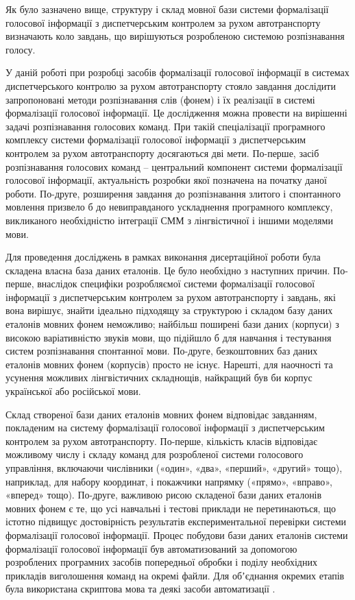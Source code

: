 Як було зазначено вище, структуру і склад мовної бази системи формалізації голосової інформації з диспетчерським контролем за рухом автотранспорту визначають коло завдань, що вирішуються розробленою системою розпізнавання голосу.

У даній роботі при розробці засобів формалізації голосової інформації в системах диспетчерського контролю за рухом автотранспорту стояло завдання дослідити запропоновані методи розпізнавання слів (фонем) і їх реалізації в системі формалізації голосової інформації. Це дослідження можна провести на вирішенні задачі розпізнавання голосових команд. При такій спеціалізації програмного комплексу системи формалізації голосової інформації з диспетчерським контролем за рухом автотранспорту досягаються дві мети. По-перше, засіб розпізнавання голосових команд – центральний компонент системи формалізації голосової інформації, актуальність розробки якої позначена на початку даної роботи. По-друге, розширення завдання до розпізнавання злитого і спонтанного мовлення призвело б до невиправданого ускладнення програмного комплексу, викликаного необхідністю інтеграції СММ з лінгвістичної і іншими моделями мови.

Для проведення досліджень в рамках виконання дисертаційної роботи була складена власна база даних еталонів. Це було необхідно з наступних причин. По-перше, внаслідок специфіки розробляємої системи формалізації голосової інформації з диспетчерським контролем за рухом автотранспорту і завдань, які вона вирішує, знайти ідеально підходящу за структурою і складом базу даних еталонів мовних фонем неможливо; найбільш поширені бази даних (корпуси) з високою варіативністю звуків мови, що підійшло б для навчання і тестування систем розпізнавання спонтанної мови. По-друге, безкоштовних баз даних еталонів мовних фонем (корпусів) просто не існує. Нарешті, для наочності та усунення можливих лінгвістичних складнощів, найкращий був би корпус української або російської мови.

Склад створеної бази даних еталонів мовних фонем відповідає завданням, покладеним на систему формалізації голосової інформації з диспетчерським контролем за рухом автотранспорту. По-перше, кількість класів відповідає можливому числу і складу команд для розробленої системи голосового управління, включаючи числівники («один», «два», «перший», «другий» тощо), наприклад, для набору координат, і покажчики напрямку («прямо», «вправо», «вперед» тощо). По-друге, важливою рисою складеної бази даних еталонів мовних фонем є те, що усі навчальні і тестові приклади не перетинаються, що істотно підвищує достовірність результатів експериментальної перевірки системи формалізації голосової інформації. Процес побудови бази даних еталонів системи формалізації голосової інформації був автоматизований за допомогою розроблених програмних засобів попередньої обробки і поділу необхідних прикладів виголошення команд на окремі файли. Для обʼєднання окремих етапів була використана скриптова мова та деякі засоби автоматизації \cite{tange_ole_2018_1146014}.

